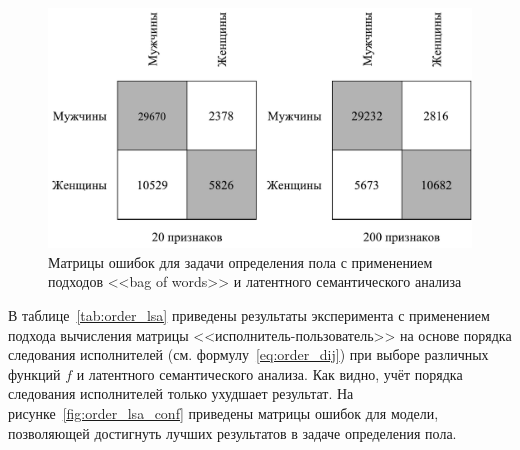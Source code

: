\begin{figure}[!h]
\caption{Матрицы ошибок для задачи определения пола с
         применением подходов <<bag of words>> и
         латентного семантического анализа}
\label{fig:bow_lsa_conf}
\centering
\includegraphics[scale=0.75]{figs/bow-lsa-confusion.pdf}
\end{figure}

В таблице~\ref{tab:order_lsa} приведены результаты эксперимента
с применением подхода вычисления матрицы <<исполнитель-пользователь>>
на основе порядка следования исполнителей (см. формулу~\ref{eq:order_dij})
при выборе различных функций $f$ и латентного семантического анализа.
Как видно, учёт порядка следования исполнителей только ухудшает результат.
На рисунке~\ref{fig:order_lsa_conf} приведены матрицы ошибок для 
модели, позволяющей достигнуть лучших результатов в задаче определения
пола.

